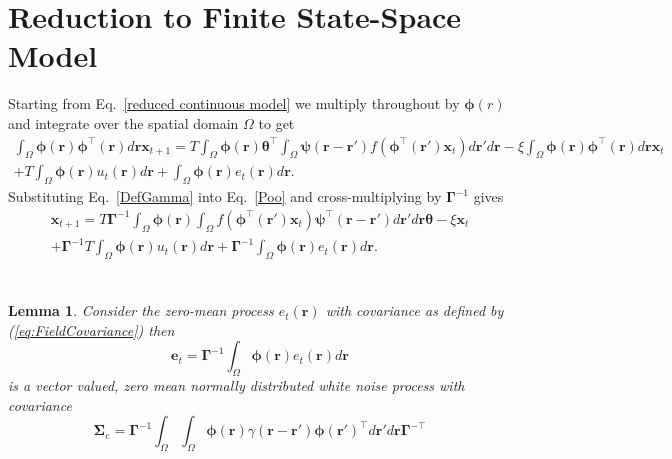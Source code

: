 \documentclass[12pt]{iopart}		%
\begin{document}
\section{Reduction to Finite State-Space Model}\label{Simplifying Decomposition}
Starting from Eq.~\ref{reduced continuous model} we multiply throughout by $\boldsymbol{\phi}(r)$ and integrate over the spatial domain $\Omega$ to get
\begin{eqnarray}\label{Poo}
	\int_\Omega  {\boldsymbol{\phi} \left(\mathbf{r}\right)\boldsymbol{\phi}^{\top}\left(\mathbf{r}\right) d\mathbf{r}} \mathbf{x}_{t+1} = T \int_\Omega  {\boldsymbol{\phi} (\mathbf{r}) \boldsymbol{\theta}^{\top} \int_\Omega  {\boldsymbol{\psi}  \left(\mathbf{r}-\mathbf{r}'\right) f\left(\boldsymbol{\phi}^{\top}\left(\mathbf{r}'\right) \mathbf{x}_t \right)d\mathbf{r}'}d\mathbf{r}} - \xi\int_\Omega {\boldsymbol{\phi}(\mathbf{r})\boldsymbol{\phi}^{\top}(\mathbf{r})d\mathbf{r}} \mathbf{x}_t \\
	+ T \int_\Omega{\boldsymbol{\phi} \left(\mathbf{r}\right) u_t\left(\mathbf{r}\right)d\mathbf{r}} + \int_\Omega{\boldsymbol{\phi} \left(\mathbf{r}\right) e_t\left(\mathbf{r}\right)d\mathbf{r}}.
\end{eqnarray}
Substituting Eq.~\ref{DefGamma} into Eq.~\ref{Poo} and cross-multiplying by $\boldsymbol{\Gamma}^{-1}$ gives 
\begin{eqnarray}\label{Homogeneous SS Model}
	\mathbf{x}_{t+1} = T\boldsymbol{\Gamma}^{ - 1}\int_\Omega {\boldsymbol{\phi}\left(\mathbf{r}\right) \int_\Omega {f\left(\boldsymbol{\phi}^{\top}\left(\mathbf{r}'\right)\mathbf{x}_t\right) \boldsymbol{\psi}^{\top} \left(\mathbf{r}-\mathbf{r}'\right)d\mathbf{r}'} d\mathbf{r}} \boldsymbol{\theta} - \xi \mathbf{x}_t \\
	+ \boldsymbol{\Gamma}^{-1}T \int_\Omega{\boldsymbol{\phi} \left(\mathbf{r}\right) u_t\left(\mathbf{r}\right)d\mathbf{r}} + \boldsymbol{\Gamma}^{-1} \int_\Omega{\boldsymbol{\phi}\left(\mathbf{r}\right)e_t\left(\mathbf{r}\right)d\mathbf{r}}.
\end{eqnarray}
\section{}\label{ColoredNoise}
\newtheorem{lemma}{Lemma}
\begin{lemma}
Consider the zero-mean process $e_t\left(\mathbf r\right)$ with covariance as defined by (\ref{eq:FieldCovariance}) then
\begin{equation}
 \mathbf e_t=\boldsymbol{\Gamma}^{-1}\int_\Omega  {\boldsymbol{\phi} ( \mathbf{r} )e_t( \mathbf{r} )d\mathbf{r}}
\label{eq:AppendixWt}
\end{equation}
is a vector valued, zero mean normally distributed white noise process with covariance
\begin{equation}
\boldsymbol\Sigma_e =\mathbf{\Gamma}^{-1}\int_{\Omega}\int_{\Omega}\boldsymbol{\phi}\left(\mathbf r\right) \gamma\left(\mathbf r- \mathbf r' \right)\boldsymbol{\phi}\left(\mathbf r'\right)^{\top}d\mathbf r' d\mathbf r\mathbf{\Gamma}^{- \top} 
\end{equation}
\label{lemma:FieldCovariance}
\end{lemma}
\end{document}
